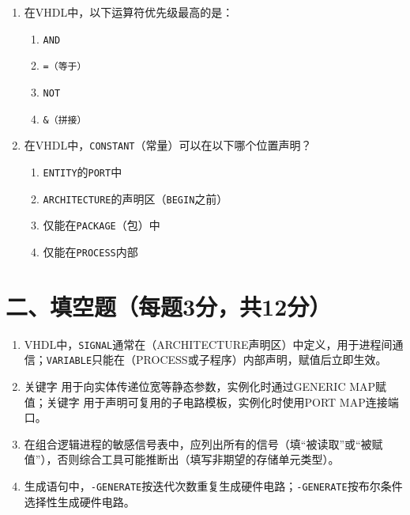 \begin{enumerate}[label=\arabic*.]
\item 在VHDL中，以下运算符优先级最高的是：
\begin{enumerate}[label=\Alph*.]
  \item \texttt{AND}
  \item \texttt{=（等于）}
  \item \texttt{NOT}
  \item \texttt{\&（拼接）}
\end{enumerate}

\item 在VHDL中，\texttt{CONSTANT}（常量）可以在以下哪个位置声明？
\begin{enumerate}[label=\Alph*.]
  \item \texttt{ENTITY}的\texttt{PORT}中
  \item \texttt{ARCHITECTURE}的声明区（\texttt{BEGIN}之前）
  \item 仅能在\texttt{PACKAGE}（包）中
  \item 仅能在\texttt{PROCESS}内部
\end{enumerate}

\end{enumerate}

\section*{二、填空题（每题3分，共12分）}

\begin{enumerate}[label=\arabic*.]
\item VHDL中，\texttt{SIGNAL}通常在\underline{\hspace{2.5cm}}（ARCHITECTURE声明区）中定义，用于进程间通信；\texttt{VARIABLE}只能在\underline{\hspace{2.5cm}}（PROCESS或子程序）内部声明，赋值后立即生效。

\item 关键字 \underline{\hspace{2.5cm}} 用于向实体传递位宽等静态参数，实例化时通过GENERIC MAP赋值；关键字 \underline{\hspace{2.5cm}} 用于声明可复用的子电路模板，实例化时使用PORT MAP连接端口。

\item 在组合逻辑进程的敏感信号表中，应列出所有\underline{\hspace{2.5cm}}的信号（填“被读取”或“被赋值”），否则综合工具可能推断出\underline{\hspace{2.5cm}}（填写非期望的存储单元类型）。

\item 生成语句中，\underline{\hspace{2cm}}\texttt{-GENERATE}按迭代次数重复生成硬件电路；\underline{\hspace{2cm}}\texttt{-GENERATE}按布尔条件选择性生成硬件电路。
\end{enumerate}

